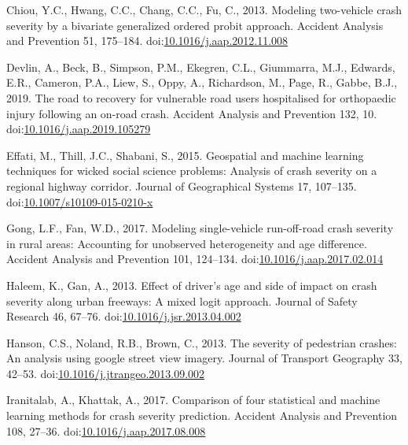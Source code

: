 \documentclass[]{elsarticle} %
\begin{document}
\leavevmode\hypertarget{ref-Chiou2013modeling}{}%
Chiou, Y.C., Hwang, C.C., Chang, C.C., Fu, C., 2013. Modeling
two-vehicle crash severity by a bivariate generalized ordered probit
approach. Accident Analysis and Prevention 51, 175--184.
doi:\href{https://doi.org/10.1016/j.aap.2012.11.008}{10.1016/j.aap.2012.11.008}

\leavevmode\hypertarget{ref-Devlin2019road}{}%
Devlin, A., Beck, B., Simpson, P.M., Ekegren, C.L., Giummarra, M.J.,
Edwards, E.R., Cameron, P.A., Liew, S., Oppy, A., Richardson, M., Page,
R., Gabbe, B.J., 2019. The road to recovery for vulnerable road users
hospitalised for orthopaedic injury following an on-road crash. Accident
Analysis and Prevention 132, 10.
doi:\href{https://doi.org/10.1016/j.aap.2019.105279}{10.1016/j.aap.2019.105279}

\leavevmode\hypertarget{ref-Effati2015geospatial}{}%
Effati, M., Thill, J.C., Shabani, S., 2015. Geospatial and machine
learning techniques for wicked social science problems: Analysis of
crash severity on a regional highway corridor. Journal of Geographical
Systems 17, 107--135.
doi:\href{https://doi.org/10.1007/s10109-015-0210-x}{10.1007/s10109-015-0210-x}

\leavevmode\hypertarget{ref-Gong2017modeling}{}%
Gong, L.F., Fan, W.D., 2017. Modeling single-vehicle run-off-road crash
severity in rural areas: Accounting for unobserved heterogeneity and age
difference. Accident Analysis and Prevention 101, 124--134.
doi:\href{https://doi.org/10.1016/j.aap.2017.02.014}{10.1016/j.aap.2017.02.014}

\leavevmode\hypertarget{ref-Haleem2013effect}{}%
Haleem, K., Gan, A., 2013. Effect of driver's age and side of impact on
crash severity along urban freeways: A mixed logit approach. Journal of
Safety Research 46, 67--76.
doi:\href{https://doi.org/10.1016/j.jsr.2013.04.002}{10.1016/j.jsr.2013.04.002}

\leavevmode\hypertarget{ref-Hanson2013severity}{}%
Hanson, C.S., Noland, R.B., Brown, C., 2013. The severity of pedestrian
crashes: An analysis using google street view imagery. Journal of
Transport Geography 33, 42--53.
doi:\href{https://doi.org/10.1016/j.jtrangeo.2013.09.002}{10.1016/j.jtrangeo.2013.09.002}

\leavevmode\hypertarget{ref-Iranitalab2017comparison}{}%
Iranitalab, A., Khattak, A., 2017. Comparison of four statistical and
machine learning methods for crash severity prediction. Accident
Analysis and Prevention 108, 27--36.
doi:\href{https://doi.org/10.1016/j.aap.2017.08.008}{10.1016/j.aap.2017.08.008}
\end{document}
